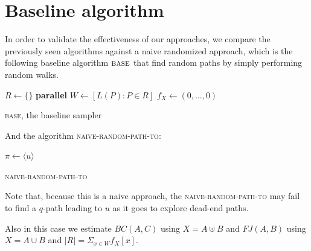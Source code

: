 \clearpage

\section{Baseline algorithm}

In order to validate the effectiveness of our approaches, we compare the previously seen algorithms against a naive randomized approach, which is the following baseline algorithm $\textsc{base}$ that find random paths by simply performing random walks.

\begin{algorithm}[h]
		
	\small
	\DontPrintSemicolon
	\BlankLine
	$R\gets\{\}$\;
	\BlankLine
	\textbf{parallel} 
	\BlankLine
	$W \gets [ L(P) : P \in R ]$\;
	$f_X \gets (0,\ldots,0)$\;
	\BlankLine
	\BlankLine
	\BlankLine
	\caption{\textsc{base}\xspace, the baseline sampler}
	\label{alg:base}
\end{algorithm}
	
And the algorithm \textsc{naive-random-path-to}:
	
\begin{algorithm}[h]
	\small
	\DontPrintSemicolon
	$\pi\gets \langle u \rangle$\;
	\Return{$\pi$}   
		
	\caption{\textsc{naive-random-path-to}}
	\label{alg:naive-random-path-to}
\end{algorithm}

Note that, because this is a naive approach, the \textsc{naive-random-path-to} may fail to find a $q$-path leading to $u$ as it goes to explore dead-end paths.

Also in this case we estimate $BC(A,C)$ using $X = A \uplus B$ and $FJ(A,B)$ using $X = A \cup B$ and $|R| = \Sigma_{x \in W} f_{X}[x]$.

\clearpage